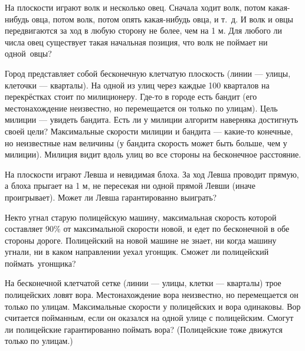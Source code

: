 \documentclass[a4paper, 12pt]{article}
\begin{document}
На плоскости играют %
волк и несколько овец. Сначала ходит волк, потом
какая-нибудь овца, потом волк, потом опять
какая-нибудь овца, и т.~д. И волк и овцы передвигаются за ход
в любую сторону не более, чем на 1 м. Для любого ли числа
овец существует такая начальная позиция, что волк не поймает ни одной~овцы?

Город представляет собой бесконечную клетчатую плоскость (линии --- улицы,
клеточки --- кварталы). На одной из улиц через каждые 100 кварталов на
перекр\"естках стоит по милиционеру. Где-то в городе есть бандит
(его местонахождение неизвестно, но перемещается он только по улицам).
Цель милиции --- увидеть бандита.
Есть ли у милиции алгоритм наверняка достигнуть своей цели?
Максимальные скорости милиции и бандита
--- какие-то конечные, но неизвестные нам величины (у бандита
скорость может быть больше, чем у милиции). Милиция видит вдоль
улиц во все стороны на бесконечное расстояние.


На плоскости играют Левша и невидимая блоха.
За ход Левша проводит прямую, а блоха прыгает на 1 м, не пересекая ни одной прямой Левши (иначе проигрывает).
Может ли Левша гарантированно выиграть?

Некто угнал старую полицейскую машину, максимальная скорость которой
составляет 90\% от максимальной скорости новой, и едет по бесконечной в обе стороны дороге.
Полицейский на новой машине не знает, ни когда машину угнали, ни в каком направлении
уехал угонщик.
Сможет ли полицейский поймать~угонщика?

На бесконечной клетчатой сетке (линии --- улицы, клетки --- кварталы) трое полицейских
ловят вора. Местонахождение вора неизвестно, но перемещается он только по улицам.
Максимальные скорости у полицейских и вора одинаковы.
Вор считается пойманным, если он оказался на одной улице с полицейским.
Смогут ли полицейские гарантированно поймать вора? (Полицейские тоже движутся только по улицам.)

%

\vspace*{-1mm}
\end{document}

